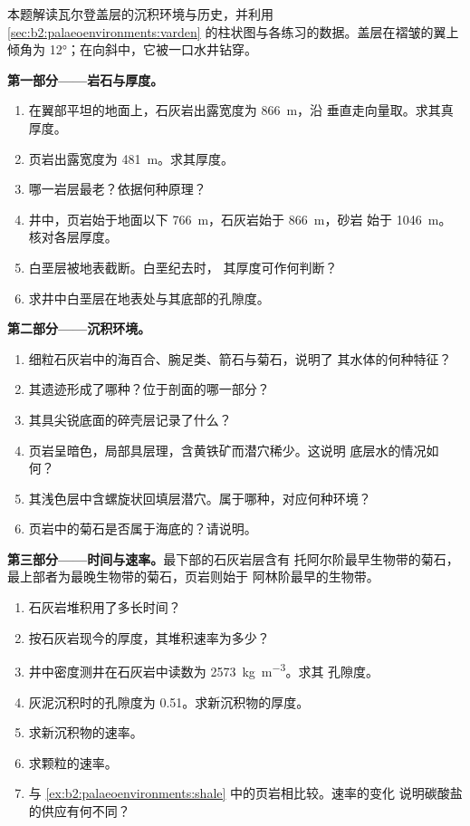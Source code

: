 \begin{problem}\label{pb:b2:palaeoenvironments:1}
本题解读瓦尔登盖层的沉积环境与历史，并利用
\cref{sec:b2:palaeoenvironments:varden} 的柱状图与各练习的数据。盖层在褶皱的翼上
倾角为 \ang{12}；在向斜中，它被一口水井钻穿。

\medskip\noindent\textbf{第一部分——岩石与厚度。}
\begin{enumerate}
  \item 在翼部平坦的地面上，石灰岩出露宽度为 \qty{866}{m}，沿
        垂直走向量取。求其真厚度。
  \item 页岩出露宽度为 \qty{481}{m}。求其厚度。
  \item 哪一岩层最老？依据何种原理？
  \item 井中，页岩始于地面以下 \qty{766}{m}，石灰岩始于 \qty{866}{m}，砂岩
        始于 \qty{1046}{m}。核对各层厚度。
  \item 白垩层被地表截断。白垩纪去时，
        其厚度可作何判断？
  \item 求井中白垩层在地表处与其底部的孔隙度。
\end{enumerate}

\medskip\noindent\textbf{第二部分——沉积环境。}
\begin{enumerate}[resume]
  \item 细粒石灰岩中的海百合、腕足类、箭石与菊石，说明了
        其水体的何种特征？
  \item 其遗迹形成了哪种？位于剖面的哪一部分？
  \item 其具尖锐底面的碎壳层记录了什么？
  \item 页岩呈暗色，局部具层理，含黄铁矿而潜穴稀少。这说明
        底层水的情况如何？
  \item 其浅色层中含螺旋状回填层潜穴。属于哪种，对应何种环境？
  \item 页岩中的菊石是否属于海底的？请说明。
\end{enumerate}

\medskip\noindent\textbf{第三部分——时间与速率。}最下部的石灰岩层含有
托阿尔阶最早生物带的菊石，最上部者为最晚生物带的菊石，页岩则始于
阿林阶最早的生物带。
\begin{enumerate}[resume]
  \item 石灰岩堆积用了多长时间？
  \item 按石灰岩现今的厚度，其堆积速率为多少？
  \item 井中密度测井在石灰岩中读数为 \qty{2573}{kg.m^{-3}}。求其
        孔隙度。
  \item 灰泥沉积时的孔隙度为 0.51。求新沉积物的厚度。
  \item 求新沉积物的速率。
  \item 求颗粒的速率。
  \item 与 \cref{ex:b2:palaeoenvironments:shale} 中的页岩相比较。速率的变化
        说明碳酸盐的供应有何不同？
\end{enumerate}


\end{problem}
